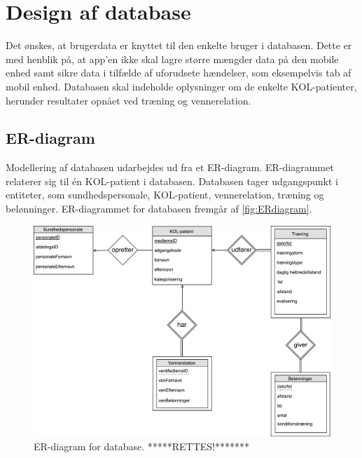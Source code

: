 \newpage
\section{Design af database} \label{sec:ER}
Det ønskes, at brugerdata er knyttet til den enkelte bruger i databasen. Dette er med henblik på, at app'en ikke skal lagre større mængder data på den mobile enhed samt sikre data i tilfælde af uforudsete hændelser, som eksempelvis tab af mobil enhed. Databasen skal indeholde oplysninger om de enkelte KOL-patienter, herunder resultater opnået ved træning og vennerelation. 

\subsection{ER-diagram}
Modellering af databasen udarbejdes ud fra et ER-diagram. ER-diagrammet relaterer sig til én KOL-patient i databasen. Databasen tager udgangspunkt i entiteter, som sundhedspersonale, KOL-patient, vennerelation, træning og belønninger. ER-diagrammet for databasen fremgår af \autoref{fig:ERdiagram}.

\begin{figure} [H]
\centering
\includegraphics[width=1\textwidth]{figures/Aktivitetsdiagram/ERdiagram}
\caption{ER-diagram for database. *****RETTES!*******}
\label{fig:ERdiagram}
\end{figure} 

